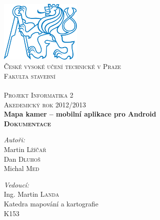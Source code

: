 \documentclass[10pt,a4paper, titlepage]{report}
\begin{document}
\begin{titlepage}
\begin{center}


\includegraphics[width=0.3\textwidth]{pics/logo_cvut.jpg}\\[0.4cm]

\textsc{České vysoké učení technické v Praze\\Fakulta stavební}\\[0.4cm]
\textsc{\\\small{Projekt Informatika 2} \\\small{Akedemický rok 2012/2013}}\\[0.4cm]

 \huge \bfseries{Mapa kamer -- mobilní aplikace pro Android}\\\textsc{\small{Dokumentace}}\\[0.4cm]

\begin{minipage}{0.4\textwidth}
\begin{flushleft} \large
\emph{Autoři:}\\
Martin \textsc{Lžíčař}\\
Dan \textsc{Dluhoš}\\ 
Michal \textsc{Med}
\end{flushleft}
\end{minipage}
\begin{minipage}{0.4\textwidth}
\begin{flushright} \large
\emph{Vedoucí:} \\
Ing. Martin \textsc{Landa}\\
Katedra mapování a kartografie\\
K153
\end{flushright}
\end{minipage}

\vfill


\end{center}
\end{titlepage}
\end{document}
